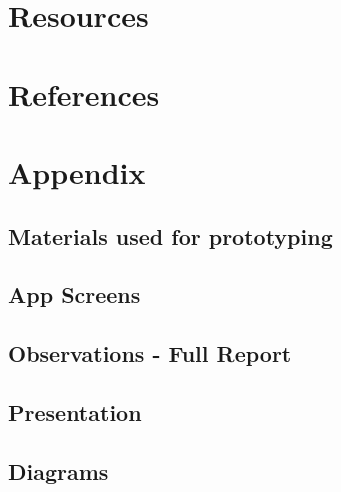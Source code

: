 \documentclass[a4paper, 12pt,conference]{new_cit_thesis}
\begin{document}
\chapter{Resources}
\chapter{References}
\chapter{Appendix}
\section{Materials used for prototyping}
\section{App Screens}
\section{Observations - Full Report}
\section{Presentation}
\section*{Diagrams}





\end{document}
